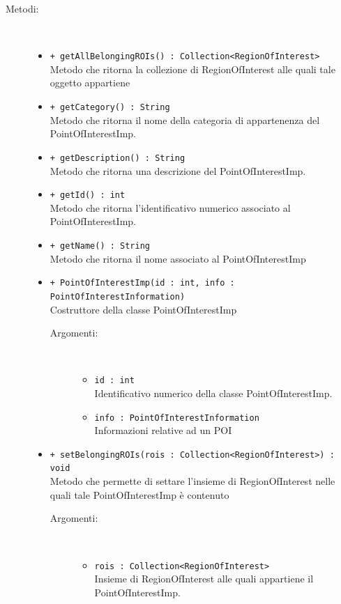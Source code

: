 \documentclass[../DefinizioneDiProdotto.tex]{subfiles}
\begin{document}
\begin{description}
\begin{itemize}
\end{itemize}
\item[Metodi:] \
\begin{itemize}
\item \texttt{+ getAllBelongingROIs() : Collection<RegionOfInterest>}\\
Metodo che ritorna la collezione di RegionOfInterest alle quali tale oggetto appartiene
 \item \texttt{+ getCategory() : String}\\
Metodo che ritorna il nome della categoria di appartenenza del PointOfInterestImp.
 \item \texttt{+ getDescription() : String}\\
Metodo che ritorna una descrizione del PointOfInterestImp.
 \item \texttt{+ getId() : int}\\
Metodo che ritorna l'identificativo numerico associato al PointOfInterestImp.
 \item \texttt{+ getName() : String}\\
Metodo che ritorna il nome associato al PointOfInterestImp
 \item \texttt{+ PointOfInterestImp(id  : int, info : PointOfInterestInformation)}\\
Costruttore della classe PointOfInterestImp
 \begin{description}
\item[Argomenti:] \
\begin{itemize}
\item \texttt{id  : int}\\
Identificativo numerico della classe PointOfInterestImp.\item \texttt{info : PointOfInterestInformation}\\
Informazioni relative ad un POI\end{itemize}
\end{description}
\item \texttt{+ setBelongingROIs(rois : Collection<RegionOfInterest>) : void}\\
Metodo che permette di settare l'insieme di RegionOfInterest nelle quali tale PointOfInterestImp è contenuto
 \begin{description}
\item[Argomenti:] \
\begin{itemize}
\item \texttt{rois : Collection<RegionOfInterest>}\\
Insieme di RegionOfInterest alle quali appartiene il PointOfInterestImp.\end{itemize}
\end{description}
\end{itemize}
\end{description}
\end{document}
